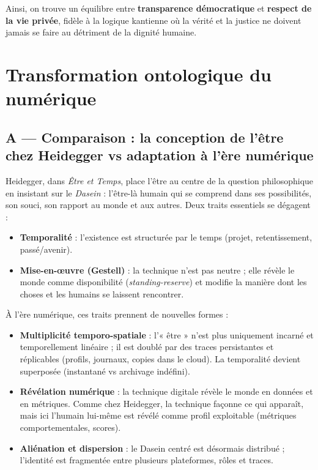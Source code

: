 \documentclass[memoire, 12pt]{report}
\begin{document}
\begin{titlepage}
Ainsi, on trouve un équilibre entre \textbf{transparence démocratique} et \textbf{respect de la vie privée}, fidèle à la logique kantienne où 
la vérité et la justice ne doivent jamais se faire au détriment de la dignité humaine.

\newpage

\section*{Transformation ontologique du numérique}

\subsection*{A — Comparaison : la conception de l’être chez Heidegger vs adaptation à l’ère numérique}

Heidegger, dans \textit{Être et Temps}, place l’être au centre de la question philosophique en insistant sur le \textit{Dasein} : l’être-là humain qui se comprend dans ses possibilités, son souci, son rapport au monde et aux autres. Deux traits essentiels se dégagent :

\begin{itemize}
    \item \textbf{Temporalité} : l’existence est structurée par le temps (projet, retentissement, passé/avenir).
    \item \textbf{Mise-en-œuvre (Gestell)} : la technique n’est pas neutre ; elle révèle le monde comme \og disponibilité \fg{} (\textit{standing-reserve}) et modifie la manière dont les choses et les humains se laissent rencontrer.
\end{itemize}

À l’ère numérique, ces traits prennent de nouvelles formes :

\begin{itemize}
    \item \textbf{Multiplicité temporo-spatiale} : l’« être » n’est plus uniquement incarné et temporellement linéaire ; il est doublé par des traces persistantes et réplicables (profils, journaux, copies dans le cloud). La temporalité devient superposée (instantané vs archivage indéfini).
    \item \textbf{Révélation numérique} : la technique digitale révèle le monde en données et en métriques. Comme chez Heidegger, la technique façonne ce qui apparaît, mais ici l’humain lui-même est révélé comme profil exploitable (métriques comportementales, scores).
    \item \textbf{Aliénation et dispersion} : le Dasein centré est désormais distribué ; l’identité est fragmentée entre plusieurs plateformes, rôles et traces.
\end{itemize}


\end{titlepage}
\end{document}
